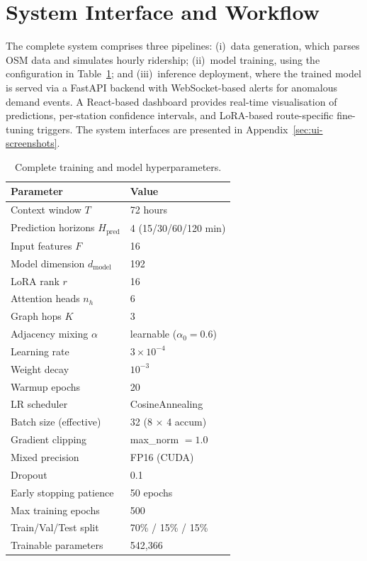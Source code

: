 \section{System Interface and Workflow}
\label{sec:workflow}

The complete system comprises three pipelines: (i)~data generation, which parses OSM data and simulates hourly ridership; (ii)~model training, using the configuration in Table~\ref{Tab.hyperparams}; and (iii)~inference deployment, where the trained model is served via a FastAPI backend with WebSocket-based alerts for anomalous demand events. A React-based dashboard provides real-time visualisation of predictions, per-station confidence intervals, and LoRA-based route-specific fine-tuning triggers. The system interfaces are presented in Appendix~\ref{sec:ui-screenshots}.

\begin{table}[H]
\centering
\caption{Complete training and model hyperparameters.}
\label{Tab.hyperparams}
\begin{tabular}{ll}
\toprule
Parameter & Value \\
\midrule
Context window $T$ & 72 hours \\
Prediction horizons $H_{\text{pred}}$ & 4 (15/30/60/120 min) \\
Input features $F$ & 16 \\
Model dimension $d_{\text{model}}$ & 192 \\
LoRA rank $r$ & 16 \\
Attention heads $n_h$ & 6 \\
Graph hops $K$ & 3 \\
Adjacency mixing $\alpha$ & learnable ($\alpha_0 = 0.6$) \\
Learning rate & $3 \times 10^{-4}$ \\
Weight decay & $10^{-3}$ \\
Warmup epochs & 20 \\
LR scheduler & CosineAnnealing \\
Batch size (effective) & 32 (8 $\times$ 4 accum) \\
Gradient clipping & max\_norm $= 1.0$ \\
Mixed precision & FP16 (CUDA) \\
Dropout & 0.1 \\
Early stopping patience & 50 epochs \\
Max training epochs & 500 \\
Train/Val/Test split & 70\% / 15\% / 15\% \\
Trainable parameters & 542{,}366 \\
\bottomrule
\end{tabular}
\end{table}

